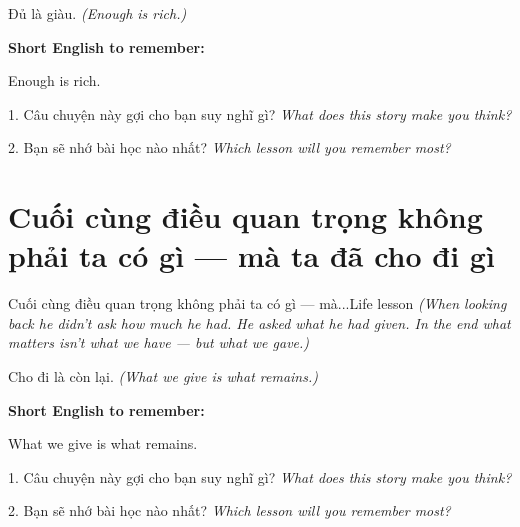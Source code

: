 \begin{baihoc}
Đủ là giàu.
\textit{(Enough is rich.)}
\end{baihoc}

\begin{ghinhoanh}
\textbf{Short English to remember:}

Enough is rich.

\end{ghinhoanh}

\begin{tuhocnhanh}
1. Câu chuyện này gợi cho bạn suy nghĩ gì? \textit{What does this story make you think?}

2. Bạn sẽ nhớ bài học nào nhất? \textit{Which lesson will you remember most?}
\end{tuhocnhanh}
\ngancach


\section{Cuối cùng điều quan trọng không phải ta có gì — mà ta đã cho đi gì}
\begin{truyen}{Cuối cùng điều quan trọng không phải ta có gì — mà...}{Life lesson}
\textit{(When looking back he didn't ask how much he had. He asked what he had given. In the end what matters isn't what we have — but what we gave.)}
\end{truyen}

\begin{baihoc}
Cho đi là còn lại.
\textit{(What we give is what remains.)}
\end{baihoc}

\begin{ghinhoanh}
\textbf{Short English to remember:}

What we give is what remains.

\end{ghinhoanh}

\begin{tuhocnhanh}
1. Câu chuyện này gợi cho bạn suy nghĩ gì? \textit{What does this story make you think?}

2. Bạn sẽ nhớ bài học nào nhất? \textit{Which lesson will you remember most?}
\end{tuhocnhanh}
\ngancach
